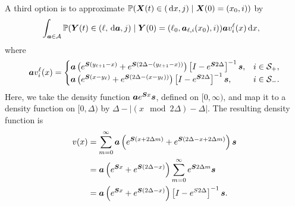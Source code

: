A third option is to approximate \(\mathbb P(\boldsymbol X(t)\in (\, \mathrm{d} x, j)\mid \boldsymbol X(0)=(x_0, i)) \) by
\begin{align}
	\label{eqn: density approx 4+}&
		\displaystyle\int_{\boldsymbol a \in\mathcal A}\mathbb P(\boldsymbol Y(t) \in (\ell, \, \mathrm{d} \boldsymbol a,j)\mid \boldsymbol Y(0) = (\ell_0, \boldsymbol  a_{\ell,i}(x_0), i)) \boldsymbol a v_i^\ell(x) \, \mathrm{d} x ,
\end{align}
{where}
\begin{align}
		\boldsymbol a v_i^\ell(x) = \begin{cases}
			\boldsymbol a \left(e^{ \boldsymbol{S}(y_{\ell+1}-x)} + e^{ \boldsymbol{S}(2\Delta-(y_{\ell+1}-x))} \right)\left[I-e^{\boldsymbol S 2\Delta}\right]^{-1}\boldsymbol s, & i\in\mathcal{S}_+, \\ 
			\boldsymbol a \left(e^{ \boldsymbol{S}(x-y_\ell)}+e^{ \boldsymbol{S}(2\Delta-(x-y_\ell))}\right) \left[I-e^{\boldsymbol S 2\Delta}\right]^{-1}\boldsymbol s, & i\in\mathcal{S}_-. \\ 
		\end{cases}
\end{align}
Here, we take the density function \(\boldsymbol a e^{\boldsymbol S x}\boldsymbol s\), defined on \([0,\infty)\), and map it to a density function on \([0,\Delta)\) by \(\Delta - |(x \mod 2\Delta )-\Delta|\). The resulting density function is 
\begin{align*}
	v(x) &= \sum_{m=0}^\infty \boldsymbol a \left(e^{\boldsymbol S (x+2\Delta m)} + e^{\boldsymbol S (2\Delta -x+2\Delta m)} \right)\boldsymbol s
	\\&= \boldsymbol a \left(e^{\boldsymbol S x} + e^{\boldsymbol S (2\Delta -x)} \right)\sum_{m=0}^\infty e^{\boldsymbol S 2\Delta m} \boldsymbol s
	\\&= \boldsymbol a \left(e^{\boldsymbol S x} + e^{\boldsymbol S (2\Delta -x)} \right)\left[I-e^{S2\Delta}\right]^{-1} \boldsymbol s.
\end{align*}


